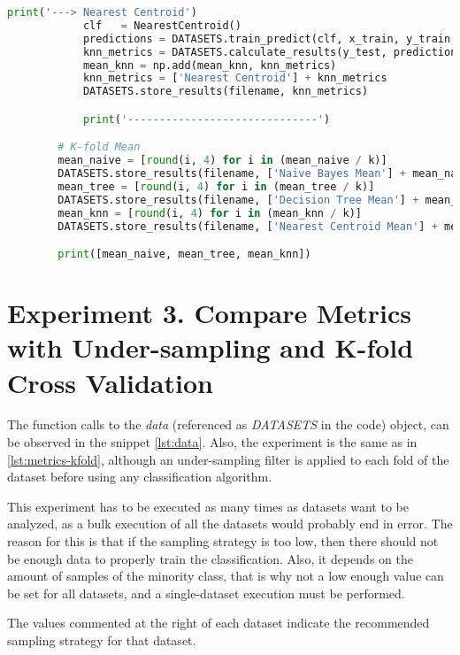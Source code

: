\begin{lstlisting}[language=Python, caption={Calculate Metrics from Confusion 
Matrix to compare in-fold results}, label={lst:metrics-kfold}]
            print('---> Nearest Centroid')
            clf   = NearestCentroid()
            predictions = DATASETS.train_predict(clf, x_train, y_train, x_test)
            knn_metrics = DATASETS.calculate_results(y_test, predictions)
            mean_knn = np.add(mean_knn, knn_metrics)
            knn_metrics = ['Nearest Centroid'] + knn_metrics
            DATASETS.store_results(filename, knn_metrics)

            print('------------------------------')

        # K-fold Mean
        mean_naive = [round(i, 4) for i in (mean_naive / k)]
        DATASETS.store_results(filename, ['Naive Bayes Mean'] + mean_naive)
        mean_tree = [round(i, 4) for i in (mean_tree / k)]
        DATASETS.store_results(filename, ['Decision Tree Mean'] + mean_tree)
        mean_knn = [round(i, 4) for i in (mean_knn / k)]
        DATASETS.store_results(filename, ['Nearest Centroid Mean'] + mean_knn)

        print([mean_naive, mean_tree, mean_knn])
\end{lstlisting}

\section{Experiment 3. Compare Metrics with Under-sampling and K-fold Cross 
Validation}\label{sec:exp3-under}

The function calls to the \textit{data} (referenced as \textit{DATASETS} in the 
code) object, can be observed in the snippet \ref{lst:data}. Also, the 
experiment is the same as in \ref{lst:metrics-kfold}, although an 
under-sampling filter is applied to each fold of the dataset before using any 
classification algorithm.

This experiment has to be executed as many times as datasets want to be 
analyzed, as a bulk execution of all the datasets would probably end in error. 
The reason for this is that if the sampling strategy is too low, then 
there should not be enough data to properly train the classification. Also,
it depends on the amount of samples of the minority class, that is why not a
low enough value can be set for all datasets, and a single-dataset execution
must be performed.

The values commented at the right of each dataset indicate the recommended
sampling strategy for that dataset.

